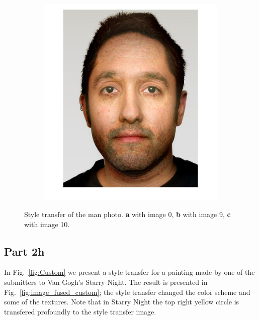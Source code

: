 \documentclass[a4paper]{iacas}
\begin{document}
\begin{figure}[!htbp]
\begin{subfigure}[b]{0.32\textwidth}
		\caption{}
		\label{fig:i_61_9}
	\end{subfigure}
	\begin{subfigure}[b]{0.32\textwidth}
		\includegraphics[width=\textwidth]{image_61_10.jpg}
		\caption{}
		\label{fig:i_61_10}
	\end{subfigure}
	
	\caption{Style transfer of the man photo. \textbf{a} with image 0, \textbf{b} with image 9, \textbf{c} with image 10.}
	\label{fig:Man}
\end{figure}

\subsection{Part 2h}

In Fig.~\ref{fig:Custom} we present a style transfer for a painting made by one of the submitters to Van Gogh's Starry Night. The result is presented in Fig.~\ref{fig:image_fused_custom}; the style transfer changed the color scheme and some of the textures. Note that in Starry Night the top right yellow circle is transfered profoundly to the style transfer image.
\end{document}
